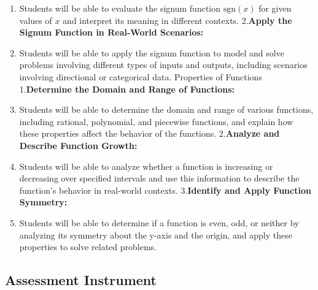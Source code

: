 \begin{enumerate}
    \item Students will be able to evaluate the signum function $ \text{sgn}(x) $ for given values of $ x $ and interpret its meaning in different contexts. 2.\textbf{Apply the Signum Function in Real-World Scenarios:}
    \item Students will be able to apply the signum function to model and solve problems involving different types of inputs and outputs, including scenarios involving directional or categorical data. Properties of Functions 1.\textbf{Determine the Domain and Range of Functions:}
    \item Students will be able to determine the domain and range of various functions, including rational, polynomial, and piecewise functions, and explain how these properties affect the behavior of the functions. 2.\textbf{Analyze and Describe Function Growth:}
    \item Students will be able to analyze whether a function is increasing or decreasing over specified intervals and use this information to describe the function's behavior in real-world contexts. 3.\textbf{Identify and Apply Function Symmetry:}
    \item Students will be able to determine if a function is even, odd, or neither by analyzing its symmetry about the y-axis and the origin, and apply these properties to solve related problems.
\end{enumerate}

\subsection{Assessment Instrument}

